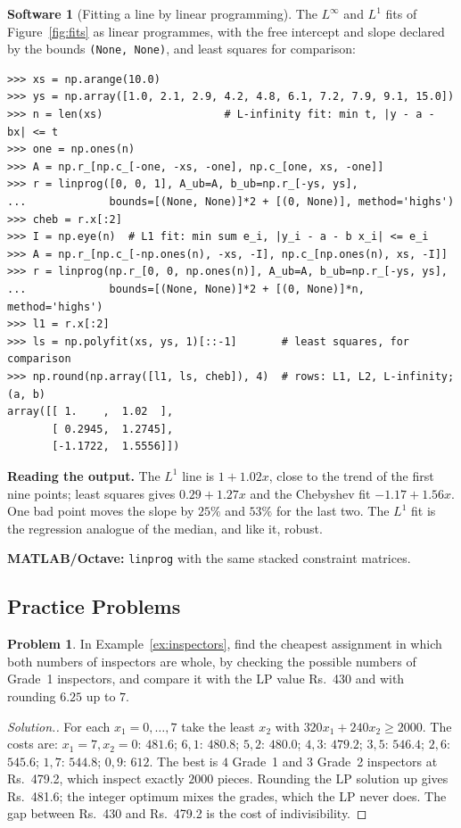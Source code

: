 \documentclass[11pt,a4paper]{article}
\numberwithin{equation}{section}
\theoremstyle{definition}
\newtheorem{software}[thm]{Software}
\newtheorem{problemx}{Problem}[subsection]
\newenvironment{problem}{\begin{problemx}}{\end{problemx}}
\newenvironment{solution}
  {\renewcommand{\qedsymbol}{}\begin{proof}[\textit{Solution}.]}
  {\end{proof}}
\begin{document}
\begin{software}[Fitting a line by linear programming]
\label{sw:fits}
The $L^\infty$ and $L^1$ fits of Figure~\ref{fig:fits} as linear programmes, with the free intercept and slope declared by the bounds \texttt{(None, None)}, and least squares for comparison:
{\small\begin{verbatim}
>>> xs = np.arange(10.0)
>>> ys = np.array([1.0, 2.1, 2.9, 4.2, 4.8, 6.1, 7.2, 7.9, 9.1, 15.0])
>>> n = len(xs)                   # L-infinity fit: min t, |y - a - bx| <= t
>>> one = np.ones(n)
>>> A = np.r_[np.c_[-one, -xs, -one], np.c_[one, xs, -one]]
>>> r = linprog([0, 0, 1], A_ub=A, b_ub=np.r_[-ys, ys],
...             bounds=[(None, None)]*2 + [(0, None)], method='highs')
>>> cheb = r.x[:2]
>>> I = np.eye(n)  # L1 fit: min sum e_i, |y_i - a - b x_i| <= e_i
>>> A = np.r_[np.c_[-np.ones(n), -xs, -I], np.c_[np.ones(n), xs, -I]]
>>> r = linprog(np.r_[0, 0, np.ones(n)], A_ub=A, b_ub=np.r_[-ys, ys],
...             bounds=[(None, None)]*2 + [(0, None)]*n, method='highs')
>>> l1 = r.x[:2]
>>> ls = np.polyfit(xs, ys, 1)[::-1]       # least squares, for comparison
>>> np.round(np.array([l1, ls, cheb]), 4)  # rows: L1, L2, L-infinity; (a, b)
array([[ 1.    ,  1.02  ],
       [ 0.2945,  1.2745],
       [-1.1722,  1.5556]])
\end{verbatim}}
\textbf{Reading the output.} The $L^1$ line is $1 + 1.02x$, close to the trend of the first nine points; least squares gives $0.29 + 1.27x$ and the Chebyshev fit $-1.17 + 1.56x$. One bad point moves the slope by $25\%$ and $53\%$ for the last two. The $L^1$ fit is the regression analogue of the median, and like it, robust.

\textbf{MATLAB/Octave:} \texttt{linprog} with the same stacked constraint matrices.
\end{software}

\subsection{Practice Problems}

\begin{problem}
\label{prob:inspectorsint}
In Example~\ref{ex:inspectors}, find the cheapest assignment in which both numbers of inspectors are whole, by checking the possible numbers of Grade~1 inspectors, and compare it with the LP value Rs.~430 and with rounding $6.25$ up to $7$.
\end{problem}

\begin{solution}
For each $x_1 = 0, \ldots, 7$ take the least $x_2$ with $320x_1 + 240x_2 \geq 2000$. The costs are: $x_1 = 7, x_2 = 0$: $481.6$; $6, 1$: $480.8$; $5, 2$: $480.0$; $4, 3$: $479.2$; $3, 5$: $546.4$; $2, 6$: $545.6$; $1, 7$: $544.8$; $0, 9$: $612$. The best is $4$ Grade~1 and $3$ Grade~2 inspectors at
Rs.~479.2, which inspect exactly $2000$ pieces. Rounding the LP solution up gives Rs.~481.6; the integer optimum mixes the grades, which the LP never does. The gap between Rs.~430 and Rs.~479.2 is the cost of indivisibility.
\end{solution}
\end{document}
